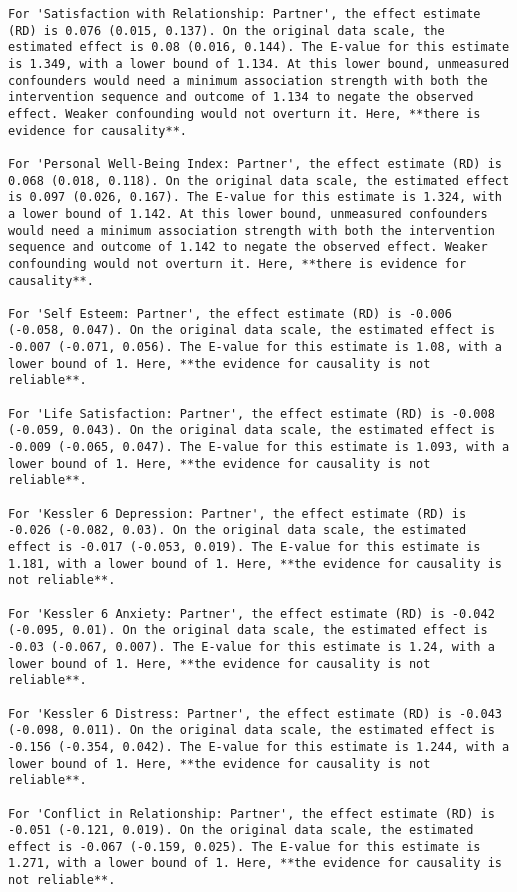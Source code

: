 \documentclass[
  singlecolumn]{article}
\begin{document}
\begin{verbatim}
For 'Satisfaction with Relationship: Partner', the effect estimate (RD) is 0.076 (0.015, 0.137). On the original data scale, the estimated effect is 0.08 (0.016, 0.144). The E-value for this estimate is 1.349, with a lower bound of 1.134. At this lower bound, unmeasured confounders would need a minimum association strength with both the intervention sequence and outcome of 1.134 to negate the observed effect. Weaker confounding would not overturn it. Here, **there is evidence for causality**.

For 'Personal Well-Being Index: Partner', the effect estimate (RD) is 0.068 (0.018, 0.118). On the original data scale, the estimated effect is 0.097 (0.026, 0.167). The E-value for this estimate is 1.324, with a lower bound of 1.142. At this lower bound, unmeasured confounders would need a minimum association strength with both the intervention sequence and outcome of 1.142 to negate the observed effect. Weaker confounding would not overturn it. Here, **there is evidence for causality**.

For 'Self Esteem: Partner', the effect estimate (RD) is -0.006 (-0.058, 0.047). On the original data scale, the estimated effect is -0.007 (-0.071, 0.056). The E-value for this estimate is 1.08, with a lower bound of 1. Here, **the evidence for causality is not reliable**.

For 'Life Satisfaction: Partner', the effect estimate (RD) is -0.008 (-0.059, 0.043). On the original data scale, the estimated effect is -0.009 (-0.065, 0.047). The E-value for this estimate is 1.093, with a lower bound of 1. Here, **the evidence for causality is not reliable**.

For 'Kessler 6 Depression: Partner', the effect estimate (RD) is -0.026 (-0.082, 0.03). On the original data scale, the estimated effect is -0.017 (-0.053, 0.019). The E-value for this estimate is 1.181, with a lower bound of 1. Here, **the evidence for causality is not reliable**.

For 'Kessler 6 Anxiety: Partner', the effect estimate (RD) is -0.042 (-0.095, 0.01). On the original data scale, the estimated effect is -0.03 (-0.067, 0.007). The E-value for this estimate is 1.24, with a lower bound of 1. Here, **the evidence for causality is not reliable**.

For 'Kessler 6 Distress: Partner', the effect estimate (RD) is -0.043 (-0.098, 0.011). On the original data scale, the estimated effect is -0.156 (-0.354, 0.042). The E-value for this estimate is 1.244, with a lower bound of 1. Here, **the evidence for causality is not reliable**.

For 'Conflict in Relationship: Partner', the effect estimate (RD) is -0.051 (-0.121, 0.019). On the original data scale, the estimated effect is -0.067 (-0.159, 0.025). The E-value for this estimate is 1.271, with a lower bound of 1. Here, **the evidence for causality is not reliable**.
\end{verbatim}
\end{document}
